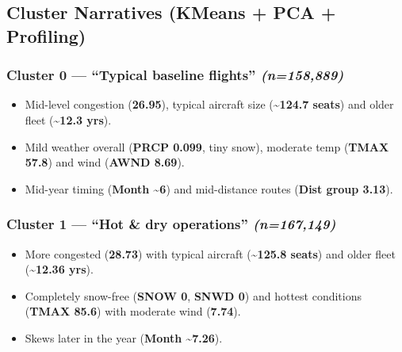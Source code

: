 \documentclass[11pt]{article}
\providecommand{\tightlist}{%
      \setlength{\itemsep}{0pt}\setlength{\parskip}{0pt}}
\begin{document}
    \begin{Verbatim}[commandchars=\\\{\}]

    \end{Verbatim}

    \subsection{Cluster Narratives (KMeans + PCA +
Profiling)}\label{cluster-narratives-kmeans-pca-profiling}

\subsubsection{\texorpdfstring{Cluster 0 --- ``Typical baseline
flights''
\emph{(n=158,889)}}{Cluster 0 --- ``Typical baseline flights'' (n=158,889)}}\label{cluster-0-typical-baseline-flights-n158889}

\begin{itemize}
\tightlist
\item
  Mid-level congestion (\textbf{26.95}), typical aircraft size
  (\textbf{\textasciitilde124.7 seats}) and older fleet
  (\textbf{\textasciitilde12.3 yrs}).
\item
  Mild weather overall (\textbf{PRCP 0.099}, tiny snow), moderate temp
  (\textbf{TMAX 57.8}) and wind (\textbf{AWND 8.69}).
\item
  Mid-year timing (\textbf{Month \textasciitilde6}) and mid-distance
  routes (\textbf{Dist group 3.13}).
\end{itemize}

\subsubsection{\texorpdfstring{Cluster 1 --- ``Hot \& dry operations''
\emph{(n=167,149)}}{Cluster 1 --- ``Hot \& dry operations'' (n=167,149)}}\label{cluster-1-hot-dry-operations-n167149}

\begin{itemize}
\tightlist
\item
  More congested (\textbf{28.73}) with typical aircraft
  (\textbf{\textasciitilde125.8 seats}) and older fleet
  (\textbf{\textasciitilde12.36 yrs}).
\item
  Completely snow-free (\textbf{SNOW 0}, \textbf{SNWD 0}) and hottest
  conditions (\textbf{TMAX 85.6}) with moderate wind (\textbf{7.74}).
\item
  Skews later in the year (\textbf{Month \textasciitilde7.26}).
\end{itemize}
\end{document}

